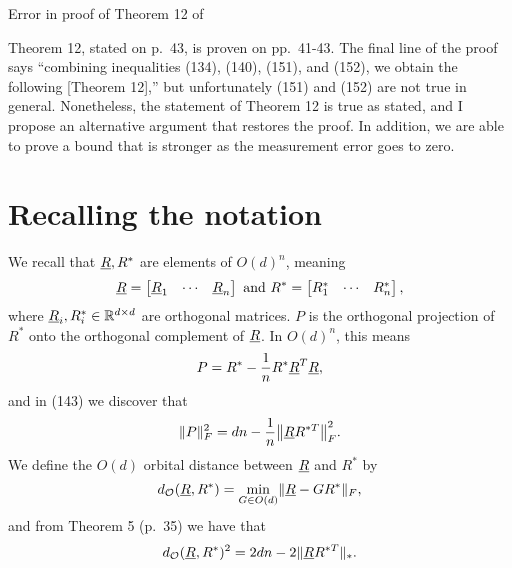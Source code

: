 \documentclass[12pt]{article}
\begin{document}
\begin{center}
  \Large Error in proof of Theorem 12 of \cite{bandeira2016se_sync}
\end{center}

Theorem 12, stated on p.~43, is proven on pp.~41-43.  The final line of the proof says ``combining inequalities (134), (140), (151), and (152), we obtain the following [Theorem 12],'' but unfortunately (151) and (152) are not true in general.  Nonetheless, the statement of Theorem 12 is true as stated, and I propose an alternative argument that restores the proof.  In addition, we are able to prove a bound that is stronger as the measurement error goes to zero.

\section{Recalling the notation}
We recall that $\underline{R}, R^*$ are elements of $O(d)^n$, meaning \[\underline{R} = \begin{bmatrix} \underline{R}_1 & \cdots & \underline{R}_n \end{bmatrix} \ \text{and} \ R^* = \begin{bmatrix} R^*_1 & \cdots & R^*_n \end{bmatrix},\] where $\underline{R}_i, R^*_i \in \mathbb{R}^{d \times d}$ are orthogonal matrices.  $P$ is the orthogonal projection of $R^*$ onto the orthogonal complement of $\underline{R}$.  In $O(d)^n$, this means \[P = R^* - \frac{1}{n} R^* \underline{R}^T \underline{R},\] and in (143) we discover that \[\norm{P}_F^2 = dn - \frac{1}{n} \norm*{\uR R^{*T}}_F^2.\]  We define the $O(d)$ orbital distance between $\underline{R}$ and $R^*$ by \[d_{\mathcal{O}}(\underline{R}, R^*) = \min_{G \in O(d)} \lVert\underline{R} - G R^*\rVert_F,\] and from Theorem 5 (p.~35) we have that \[d_{\mathcal{O}}(\underline{R}, R^*)^2 = 2 d n - 2 \lVert\underline{R} R^{*T}\rVert_*.\]
\end{document}
